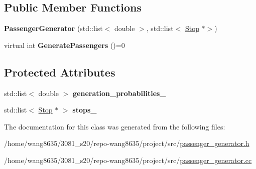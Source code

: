 \subsection*{Public Member Functions}
\begin{DoxyCompactItemize}
\item 
\mbox{\label{classPassengerGenerator_a33eeed8b68d5d596ceef5381c697e49d}} 
{\bfseries Passenger\+Generator} (std\+::list$<$ double $>$, std\+::list$<$ \hyperlink{classStop}{Stop} $\ast$$>$)
\item 
\mbox{\label{classPassengerGenerator_ad2db96a13b34fcf35977287c06b31d47}} 
virtual int {\bfseries Generate\+Passengers} ()=0
\end{DoxyCompactItemize}
\subsection*{Protected Attributes}
\begin{DoxyCompactItemize}
\item 
\mbox{\label{classPassengerGenerator_a855471e5532fec3f387a6340f928d43a}} 
std\+::list$<$ double $>$ {\bfseries generation\+\_\+probabilities\+\_\+}
\item 
\mbox{\label{classPassengerGenerator_ab09ab7ca9104385ae007d05a6e957884}} 
std\+::list$<$ \hyperlink{classStop}{Stop} $\ast$ $>$ {\bfseries stops\+\_\+}
\end{DoxyCompactItemize}


The documentation for this class was generated from the following files\+:\begin{DoxyCompactItemize}
\item 
/home/wang8635/3081\+\_\+s20/repo-\/wang8635/project/src/\hyperlink{passenger__generator_8h}{passenger\+\_\+generator.\+h}\item 
/home/wang8635/3081\+\_\+s20/repo-\/wang8635/project/src/\hyperlink{passenger__generator_8cc}{passenger\+\_\+generator.\+cc}\end{DoxyCompactItemize}
